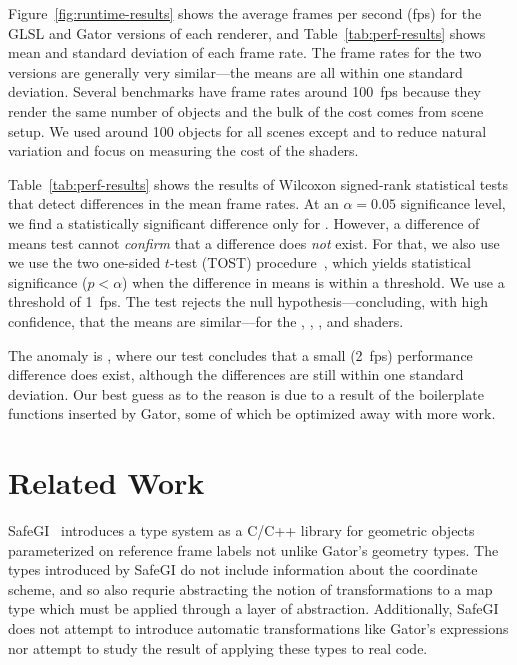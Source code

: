 \documentclass[../main.tex]{subfiles}
\begin{document}
{Figure~\ref{fig:runtime-results} shows the average frames per second (fps) for the GLSL and Gator versions of each renderer, and Table~\ref{tab:perf-results} shows mean and standard deviation of each frame rate.
The frame rates for the two versions are generally very similar---the means are all within one standard deviation.
Several benchmarks have frame rates around 100~fps because they render the same number of objects and the bulk of the cost comes from scene setup.
We used around 100 objects for all scenes except  and  to reduce natural variation and focus on measuring the cost of the shaders.

Table~\ref{tab:perf-results} shows the results of Wilcoxon signed-rank statistical tests that detect differences in the mean frame rates.
At an $\alpha = 0.05$ significance level, we find a statistically significant difference only for .
However, a difference of means test cannot \emph{confirm} that a difference does \emph{not} exist.
For that, we also use we use the two one-sided $t$-test (TOST) procedure~\cite{tost}, which yields statistical significance ($p < \alpha$) when the difference in means is within a threshold.
We use a threshold of 1~fps.
The test rejects the null hypothesis---concluding, with high confidence, that the means are similar---for the , , , and  shaders.

The anomaly is , where our test concludes that a small (2~fps) performance difference does exist, although the differences are still within one standard deviation.
Our best guess as to the reason is due to a result of the boilerplate functions inserted by Gator, some of which be optimized away with more work.

\section{Related Work}
\label{sec:rw}

SafeGI~\cite{safegi} introduces a type system as a C/C++ library for geometric objects parameterized on reference frame labels not unlike Gator's geometry types.  The types introduced by SafeGI do not include information about the coordinate scheme, and so also requrie abstracting the notion of transformations to a map type which must be applied through a layer of abstraction.  
Additionally, SafeGI does not attempt to introduce automatic transformations like Gator's  expressions nor attempt to study the result of applying these types to real code.

}
\end{document}
